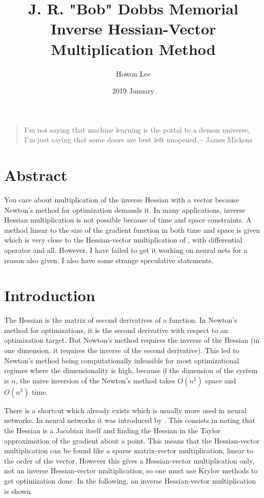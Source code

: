 \documentclass{article}
\begin{document}
\title{J. R. "Bob" Dobbs Memorial Inverse Hessian-Vector Multiplication Method}
\author{Howon Lee}
\date{2019 January}
\maketitle

\begin{quote}
I'm not saying that machine learning is the portal to a demon universe, I'm just saying that some doors are best left unopened. - James Mickens
\end{quote}

\section{Abstract}
You care about multiplication of the inverse Hessian with a vector because Newton's method for optimization demands it. In many applications, inverse Hessian multiplication is not possible because of time and space constraints. A method linear to the size of the gradient function in both time and space is given which is very close to the Hessian-vector multiplication of \cite{pearlmutter1994}, with differential operator and all. However, I have failed to get it working on neural nets for a reason also given. I also have some strange speculative statements.

\section{Introduction}

The Hessian is the matrix of second derivatives of a function. In Newton's method for optimizations, it is the second derivative with respect to an optimization target. But Newton's method requires the inverse of the Hessian (in one dimension, it requires the inverse of the second derivative). This led to Newton's method being computationally infeasible for most optimizational regimes where the dimensionality is high, because if the dimension of the system is $n$, the naive inversion of the Newton's method takes $O(n^2)$ space and $O(n^3)$ time.

There is a shortcut which already exists which is usually more used in neural networks. In neural networks it was introduced by \cite{pearlmutter1994}. This consists in noting that the Hessian is a Jacobian itself and finding the Hessian in the Taylor approximation of the gradient about a point. This means that the Hessian-vector multiplication can be found like a sparse matrix-vector multiplication, linear to the order of the vector. However this gives a Hessian-vector multiplication only, not an inverse Hessian-vector multiplication, so one must use Krylov methods to get optimization done. In the following, an inverse Hessian-vector multiplication is shown.
\end{document}
